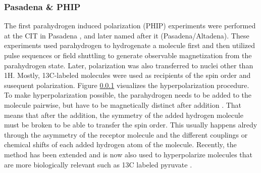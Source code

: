         \subsubsection{Pasadena \& PHIP}
        The first parahydrogen induced polarization (PHIP) experiments were performed at the CIT in Pasadena \cite{bowers_parahydrogen_1987-2}, and later named after it (Pasadena/Altadena). These experiments used parahydrogen to hydrogenate a molecule first and then utilized pulse sequences or field shuttling to generate observable magnetization from the parahydrogen state. Later, polarization was also transferred to nuclei other than 1H. Mostly, 13C-labeled molecules were used as recipients of the spin order and susequent polarization. Figure \ref{} visualizes the hyperpolarization procedure. To make hyperpolarization possible, the parahydrogen needs to be added to the molecule pairwise, but have to be magnetically distinct after addition \cite{eisenberg_parahydrogen-induced_1991}. That means that after the addition, the symmetry of the added hydrogen molecule must be broken to be able to transfer the spin order. This usually happens alredy through the asymmetry of the receptor molecule and the different couplings or chemical shifts of each added hydrogen atom of the molecule. Recently, the method has been extended and is now also used to hyperpolarize molecules that are more biologically relevant such as 13C labeled pyruvate \cite{cavallari_metabolic_2019}.
